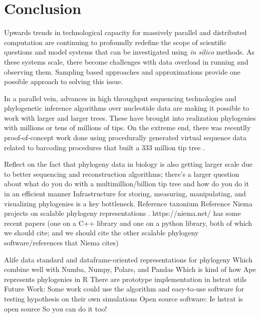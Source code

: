 \section{Conclusion} \label{sec:conclusion}

Upwards trends in technological capacity for massively parallel and distributed computation are continuing to profoundly redefine the scope of scientific questions and model systems that can be investigated using \textit{in silico} methods.
As these systems scale, there become challenges with data overload in running and observing them.
Sampling based approaches and approximations provide one possible approach to solving this issue.

In a parallel vein, advances in high throughput sequencing technologies and phylogenetic inference algorithms over nucleotide data are making it possible to work with larger and larger trees.
These have brought into realization phylogenies with millions or tens of millions of tips.
On the extreme end, there was recentlly proof-of-concept work done using procedurally generated virtual sequence data related to barcoding procedures that built a 333 million tip tree \citep{konno2022deep}.



Reflect on the fact that phylogeny data in biology is also getting larger scale due to better sequencing and reconstruction algorithms; there’s a larger question about what do you do with a multimillion/billion tip tree and how do you do it in an efficient manner
Infrastructure for storing, measuring, manipulating, and visualizing phylogenies is a key bottleneck.
Reference taxonium \citep{sanderson2022taxonium}
Reference Niema projects on scalable phylogeny representations \citep{moshiri2025compacttree,moshiri2020treeswift}.
https://niema.net/ has some recent papers (one on a C++ library and one on a python library, both of which we should cite; and we should cite the other scalable phylogeny software/references that Niema cites)

Alife data standard and dataframe-oriented representations for phylogeny
Which combine well with Numba, Numpy, Polars, and Pandas
Which is kind of how Ape represents phylogenies in R
There are prototype implementation in hstrat utils
Future Work:
Some work could use the algorithm and easy-to-use software for testing hypothesis on their own simulations
Open source software:
Ie hstrat is open source
So you can do it too!

